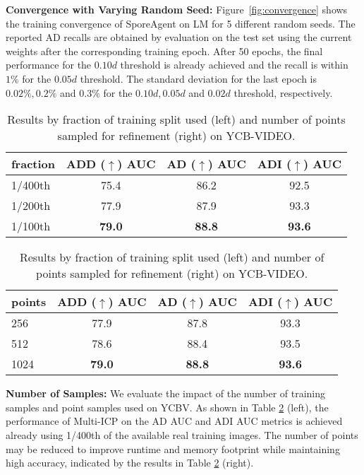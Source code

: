 \documentclass[10pt,twocolumn,letterpaper]{article}
\begin{document}
\textbf{Convergence with Varying Random Seed: }Figure~\ref{fig:convergence} shows the training convergence of SporeAgent on LM for 5 different random seeds. The reported AD recalls are obtained by evaluation on the test set using the current weights after the corresponding training epoch. After 50 epochs, the final performance for the $0.10d$ threshold is already achieved and the recall is within $1\%$ for the $0.05d$ threshold. The standard deviation for the last epoch is $0.02\%, 0.2\%$ and $0.3\%$ for the $0.10d, 0.05d$ and $0.02d$ threshold, respectively.

\begin{table}[]
\setlength\tabcolsep{0.3ex}
\footnotesize
    \centering
    \begin{tabular}{l|ccc}
     fraction & \makecell{ADD ($\uparrow$)\\AUC} & \makecell{AD ($\uparrow$)\\AUC} & \makecell{ADI ($\uparrow$)\\AUC}\\\hline
1/400th              & 75.4 & 86.2 & 92.5 \\
1/200th              & 77.9 & 87.9 & 93.3 \\
\rowcolor[rgb]{0.95,0.95,0.95}
1/100th              & \textbf{79.0} & \textbf{88.8} & \textbf{93.6} \\
    \end{tabular}\hspace{2.5ex}
        \begin{tabular}{l|ccc}
points  & \makecell{ADD ($\uparrow$)\\AUC} & \makecell{AD ($\uparrow$)\\AUC} & \makecell{ADI ($\uparrow$)\\AUC}\\\hline
256              & 77.9 & 87.8 & 93.3 \\
512              & 78.6 & 88.4 & 93.5 \\
\rowcolor[rgb]{0.95,0.95,0.95}
1024              & \textbf{79.0} & \textbf{88.8} & \textbf{93.6} \\
    \end{tabular}
    
    \vspace{1ex}
    \caption{Results by fraction of training split used (left) and number of points sampled for refinement (right) on YCB-VIDEO.}
    \label{tab:ablation_data}
\end{table}

\textbf{Number of Samples: }We evaluate the impact of the number of training samples and point samples used on YCBV. As shown in Table \ref{tab:ablation_data} (left), the performance of Multi-ICP \cite{xiang2017posecnn} on the AD AUC and ADI AUC metrics is achieved already using 1/400th of the available real training images. The number of points may be reduced to improve runtime and memory footprint while maintaining high accuracy, indicated by the results in Table \ref{tab:ablation_data} (right).
\end{document}
